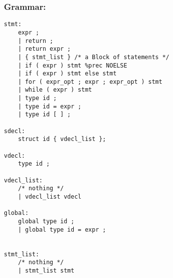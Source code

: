 \documentclass[./Report_main.tex]{subfiles}
\begin{document}
\subsubsection{Grammar:}
\begin{lstlisting}
stmt:
    expr ;
    | return ;
    | return expr ;
    | { stmt_list } /* a Block of statements */
    | if ( expr ) stmt %prec NOELSE
    | if ( expr ) stmt else stmt
    | for ( expr_opt ; expr ; expr_opt ) stmt
    | while ( expr ) stmt                      
    | type id ;
    | type id = expr ;
    | type id [ ] ;   
 
sdecl:
    struct id { vdecl_list };

vdecl:
    type id ;
    
vdecl_list:
    /* nothing */  
    | vdecl_list vdecl

global:
    global type id ;
    | global type id = expr ;


stmt_list:
    /* nothing */  
    | stmt_list stmt
 

\end{lstlisting}
\end{document}
